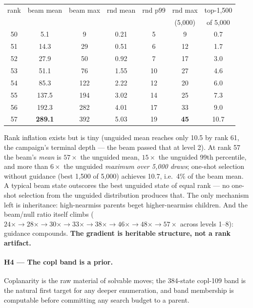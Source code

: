 \documentclass[10pt]{article}
\begin{document}
\begin{center}
\begin{tabular}{ccccccc}
\toprule
rank & beam mean & beam max & rnd mean & rnd p99 & rnd max & top-1{,}500\\
     &           &          &          &         & (5{,}000) & of 5{,}000\\
\midrule
50 & 5.1 & 9 & 0.21 & 5 & 9 & 0.7\\
51 & 14.3 & 29 & 0.51 & 6 & 12 & 1.7\\
52 & 27.9 & 50 & 0.92 & 7 & 17 & 3.0\\
53 & 51.1 & 76 & 1.55 & 10 & 27 & 4.6\\
54 & 85.3 & 122 & 2.22 & 12 & 20 & 6.0\\
55 & 137.5 & 194 & 3.02 & 14 & 25 & 7.3\\
56 & 192.3 & 282 & 4.01 & 17 & 33 & 9.0\\
57 & \textbf{289.1} & 392 & 5.03 & 19 & \textbf{45} & 10.7\\
\bottomrule
\end{tabular}
\end{center}

Rank inflation exists but is tiny (unguided mean reaches only 10.5 by
rank 61, the campaign's terminal depth --- the beam passed that at
level 2). At rank 57 the beam's \emph{mean} is $57\times$ the unguided
mean, $15\times$ the unguided 99th percentile, and more than $6\times$
the unguided \emph{maximum over 5{,}000 draws}; one-shot selection
without guidance (best 1{,}500 of 5{,}000) achieves 10.7, i.e.\ 4\% of
the beam mean. A typical beam state outscores the best unguided state
of equal rank --- no one-shot selection from the unguided distribution
produces that. The only mechanism left is inheritance: high-nearmiss
parents beget higher-nearmiss children. And the beam/null ratio itself
climbs ($24\times \to 28\times \to 30\times \to 33\times \to 38\times
\to 46\times \to 48\times \to 57\times$ across levels 1--8): guidance
compounds.
\textbf{The gradient is heritable structure, not a rank artifact.}

\paragraph{H4 --- The copl band is a prior.} Coplanarity is the raw
material of solvable moves; the 384-state copl-109 band is the natural
first target for any deeper enumeration, and band membership is
computable before committing any search budget to a parent.
\end{document}
